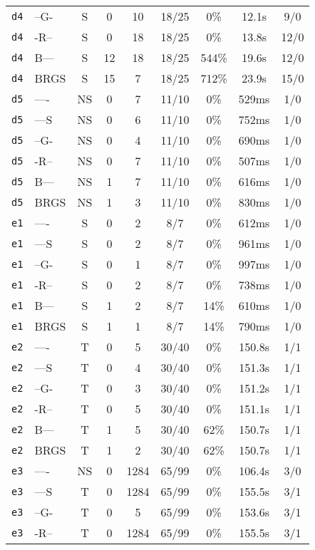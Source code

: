 \begin{tabular}{llccccccc}
\texttt{d4} & --G- & S & 0 & 10 & 18/25 & 0\% & 12.1s & 9/0 \\
\texttt{d4} & -R-- & S & 0 & 18 & 18/25 & 0\% & 13.8s & 12/0 \\
\texttt{d4} & B--- & S & 12 & 18 & 18/25 & 544\% & 19.6s & 12/0 \\
\texttt{d4} & BRGS & S & 15 & 7 & 18/25 & 712\% & 23.9s & 15/0 \\
\texttt{d5} & ---- & NS & 0 & 7 & 11/10 & 0\% & 529ms & 1/0 \\
\texttt{d5} & ---S & NS & 0 & 6 & 11/10 & 0\% & 752ms & 1/0 \\
\texttt{d5} & --G- & NS & 0 & 4 & 11/10 & 0\% & 690ms & 1/0 \\
\texttt{d5} & -R-- & NS & 0 & 7 & 11/10 & 0\% & 507ms & 1/0 \\
\texttt{d5} & B--- & NS & 1 & 7 & 11/10 & 0\% & 616ms & 1/0 \\
\texttt{d5} & BRGS & NS & 1 & 3 & 11/10 & 0\% & 830ms & 1/0 \\
\texttt{e1} & ---- & S & 0 & 2 & 8/7 & 0\% & 612ms & 1/0 \\
\texttt{e1} & ---S & S & 0 & 2 & 8/7 & 0\% & 961ms & 1/0 \\
\texttt{e1} & --G- & S & 0 & 1 & 8/7 & 0\% & 997ms & 1/0 \\
\texttt{e1} & -R-- & S & 0 & 2 & 8/7 & 0\% & 738ms & 1/0 \\
\texttt{e1} & B--- & S & 1 & 2 & 8/7 & 14\% & 610ms & 1/0 \\
\texttt{e1} & BRGS & S & 1 & 1 & 8/7 & 14\% & 790ms & 1/0 \\
\texttt{e2} & ---- & T & 0 & 5 & 30/40 & 0\% & 150.8s & 1/1 \\
\texttt{e2} & ---S & T & 0 & 4 & 30/40 & 0\% & 151.3s & 1/1 \\
\texttt{e2} & --G- & T & 0 & 3 & 30/40 & 0\% & 151.2s & 1/1 \\
\texttt{e2} & -R-- & T & 0 & 5 & 30/40 & 0\% & 151.1s & 1/1 \\
\texttt{e2} & B--- & T & 1 & 5 & 30/40 & 62\% & 150.7s & 1/1 \\
\texttt{e2} & BRGS & T & 1 & 2 & 30/40 & 62\% & 150.7s & 1/1 \\
\texttt{e3} & ---- & NS & 0 & 1284 & 65/99 & 0\% & 106.4s & 3/0 \\
\texttt{e3} & ---S & T & 0 & 1284 & 65/99 & 0\% & 155.5s & 3/1 \\
\texttt{e3} & --G- & T & 0 & 5 & 65/99 & 0\% & 153.6s & 3/1 \\
\texttt{e3} & -R-- & T & 0 & 1284 & 65/99 & 0\% & 155.5s & 3/1 \\

\end{tabular}
